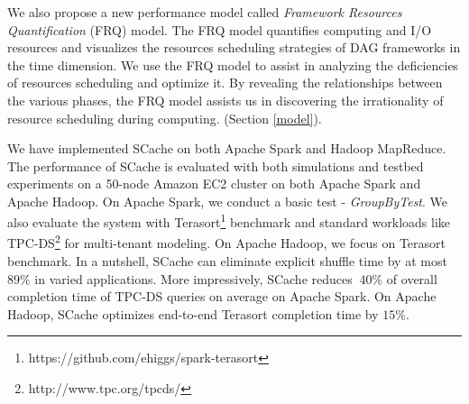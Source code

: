 {\color{blue}
We also propose a new performance model called \textit{Framework Resources Quantification} (FRQ) model. The FRQ model quantifies computing and I/O resources and visualizes the resources scheduling strategies of DAG frameworks in the time dimension. We use the FRQ model to assist in analyzing the deficiencies of resources scheduling and optimize it. 
By revealing the relationships between the various phases, the FRQ model assists us in discovering the irrationality of resource scheduling during computing. (Section \ref{model}).
}

{\color{blue}
We have implemented SCache on both Apache Spark \cite{apachespark} and Hadoop MapReduce. 
The performance of SCache is evaluated with both simulations and testbed experiments on a 50-node Amazon EC2 cluster on both Apache Spark and Apache Hadoop. On Apache Spark, we conduct a basic test - \textit{GroupByTest}. We also evaluate the system with Terasort\footnote{https://github.com/ehiggs/spark-terasort} benchmark and standard workloads like TPC-DS\footnote{http://www.tpc.org/tpcds/} for multi-tenant modeling. On Apache Hadoop, we focus on Terasort benchmark. In a nutshell, SCache can eliminate explicit shuffle time by at most $89\%$ in varied applications. More impressively, SCache reduces $~40\%$ of overall completion time of TPC-DS queries on average on Apache Spark. On Apache Hadoop, SCache optimizes end-to-end Terasort completion time by $15\%$.
}
